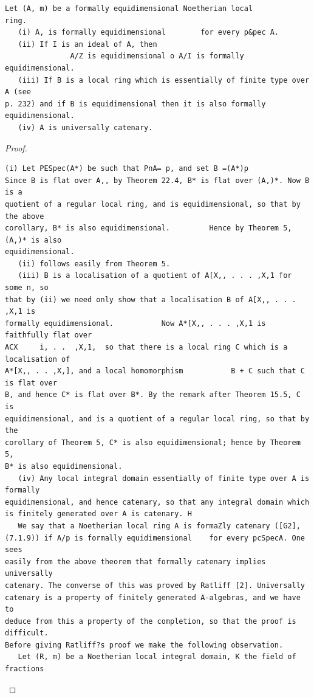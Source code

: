 \begin{theorem}\label{mcrt-auto-theorem-31-6}\uses{}
\begin{verbatim}
Let (A, m) be a formally equidimensional Noetherian local
ring.
   (i) A, is formally equidimensional        for every p&pec A.
   (ii) If I is an ideal of A, then
               A/Z is equidimensional o A/I is formally equidimensional.
   (iii) If B is a local ring which is essentially of finite type over A (see
p. 232) and if B is equidimensional then it is also formally equidimensional.
   (iv) A is universally catenary.
\end{verbatim}
\end{theorem}
\begin{proof}
\begin{verbatim}
(i) Let PESpec(A*) be such that PnA= p, and set B =(A*)p
Since B is flat over A,, by Theorem 22.4, B* is flat over (A,)*. Now B is a
quotient of a regular local ring, and is equidimensional, so that by the above
corollary, B* is also equidimensional.         Hence by Theorem 5, (A,)* is also
equidimensional.
   (ii) follows easily from Theorem 5.
   (iii) B is a localisation of a quotient of A[X,, . . . ,X,1 for some n, so
that by (ii) we need only show that a localisation B of A[X,, . . . ,X,1 is
formally equidimensional.           Now A*[X,, . . . ,X,1 is faithfully flat over
ACX     i, . .  ,X,1,  so that there is a local ring C which is a localisation of
A*[X,, . . ,X,], and a local homomorphism           B + C such that C is flat over
B, and hence C* is flat over B*. By the remark after Theorem 15.5, C is
equidimensional, and is a quotient of a regular local ring, so that by the
corollary of Theorem 5, C* is also equidimensional; hence by Theorem 5,
B* is also equidimensional.
   (iv) Any local integral domain essentially of finite type over A is formally
equidimensional, and hence catenary, so that any integral domain which
is finitely generated over A is catenary. H
   We say that a Noetherian local ring A is formaZly catenary ([G2],
(7.1.9)) if A/p is formally equidimensional    for every pcSpecA. One sees
easily from the above theorem that formally catenary implies universally
catenary. The converse of this was proved by Ratliff [2]. Universally
catenary is a property of finitely generated A-algebras, and we have to
deduce from this a property of the completion, so that the proof is difficult.
Before giving Ratliff?s proof we make the following observation.
   Let (R, m) be a Noetherian local integral domain, K the field of fractions

\end{verbatim}
\end{proof}
